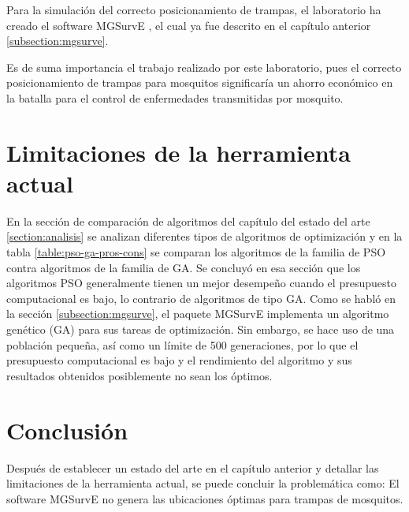 \documentclass[letterpaper]{report}
\begin{document}
    Para la simulación del correcto posicionamiento de trampas, el laboratorio
    ha creado el software MGSurvE \cite{MGSurvE}, el cual ya fue descrito en el
    capítulo anterior \ref{subsection:mgsurve}.

    Es de suma importancia el trabajo realizado por este laboratorio, pues el
    correcto posicionamiento de trampas para mosquitos significaría un ahorro
    económico en la batalla para el control de enfermedades transmitidas por
    mosquito.

  \section{Limitaciones de la herramienta actual}
    En la sección de comparación de algoritmos del capítulo del
    estado del arte
    \ref{section:analisis} se analizan diferentes tipos de algoritmos de
    optimización y en la tabla \ref{table:pso-ga-pros-cons} se comparan los
    algoritmos de la familia de PSO contra algoritmos de la familia de GA. Se
    concluyó en esa sección que los algoritmos PSO generalmente tienen un mejor
    desempeño cuando el presupuesto computacional es bajo, lo contrario de
    algoritmos de tipo GA. Como se habló en la sección \ref{subsection:mgsurve},
    el paquete MGSurvE implementa un algoritmo genético (GA) para sus tareas de
    optimización. Sin embargo, se hace uso de una población pequeña, así como un
    límite de 500 generaciones, por lo que el presupuesto computacional es bajo
    y el rendimiento del algoritmo y sus resultados obtenidos posiblemente no
    sean los óptimos.

  \section{Conclusión}
    Después de establecer un estado del arte en el capítulo anterior y detallar
    las limitaciones de la herramienta actual, se puede concluir la problemática
    como: El software MGSurvE no genera las ubicaciones óptimas para trampas de
    mosquitos. 


\end{document}
